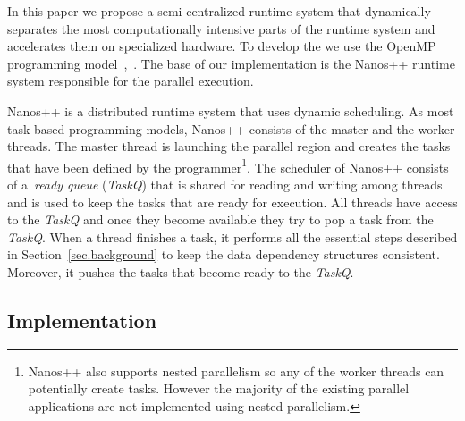 

In this paper we propose a semi-centralized runtime system that dynamically separates the most computationally intensive parts of the runtime system and accelerates them on specialized hardware. 
To develop the {\proposal} we use the OpenMP programming model~\cite{OpenMP},~\cite{OpenMP4.0:Manual2013}.
The base of our implementation is the Nanos++ runtime system responsible for the parallel execution.

Nanos++ is a distributed runtime system that uses dynamic scheduling.
As most task-based programming models, Nanos++ consists of the master and the worker threads.
The master thread is launching the parallel region and creates the tasks that have been defined by the programmer{\footnote{Nanos++ also supports nested parallelism so any of the worker threads can potentially create tasks. However the majority of the existing parallel applications are not implemented using nested parallelism.}}.
The scheduler of Nanos++ consists of a~\textit{ready queue} (\textit{TaskQ}) that is shared for reading and writing among threads and is used to keep the tasks that are ready for execution.
All threads have access to the \textit{TaskQ} and once they become available they try to pop a task from the \textit{TaskQ}.
When a thread finishes a task, it performs all the essential steps described in Section~\ref{sec.background} to keep the data dependency structures consistent.
Moreover, it pushes the tasks that become ready to the \textit{TaskQ}.



\subsection{Implementation}

